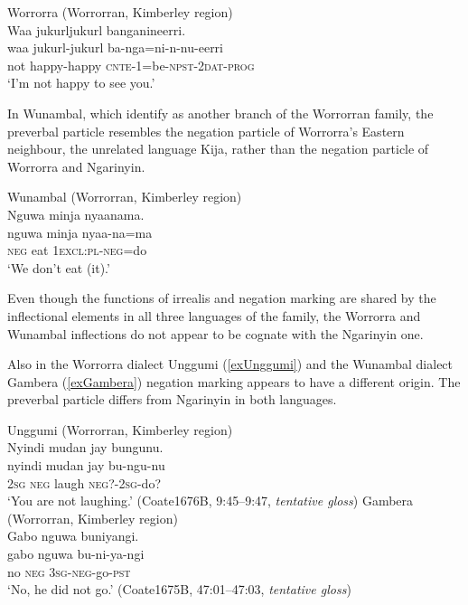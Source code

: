 \documentclass[output=paper,colorlinks,citecolor=brown]{langscibook}
\begin{document}
\begin{exe}
\ex \label{exWorrorra} {Worrorra} (Worrorran, Kimberley region)\\
    \glll Waa jukurljukurl banganineerri.\\
    waa jukurl-jukurl ba-nga=ni-n-nu-eerri\\
    not happy-happy \textsc{cnte}-1=be-\textsc{npst}-\textsc{2dat}-\textsc{prog}\\
    \trans `I'm not happy to see you.' \citep[195]{Clendon2014}
\end{exe}

In Wunambal, which \citet{McGregorRumsey2009} identify as another branch of the Worrorran family, the preverbal particle resembles the negation particle of Worrorra's Eastern neighbour, the unrelated language Kija, rather than the negation particle of Worrorra and Ngarinyin.

\begin{exe}
\ex \label{exWunambal} {Wunambal} (Worrorran, Kimberley region) \\
    \glll Nguwa minja nyaanama.\\
    nguwa minja nyaa-na=ma\\
    \textsc{neg} eat 1\textsc{excl:pl}-\textsc{neg}=do\\
    \trans `We don't eat (it).' \citep[184, cf. Kija (Jarrakan) \textit{nguwan} NEG]{Carr2000}
\end{exe}

Even though the functions of irrealis and negation marking are shared by the inflectional elements in all three languages of the family, the Worrorra and Wunambal inflections do not appear to be cognate with the Ngarinyin one.

Also in the Worrorra dialect Unggumi (\ref{exUnggumi}) and the Wunambal dialect Gambera (\ref{exGambera}) negation marking appears to have a different origin. The preverbal particle differs from Ngarinyin in both languages.

\begin{exe}
\ex \label{exUnggumi} {Unggumi} (Worrorran, Kimberley region) \\
    \glll Nyindi mudan jay bungunu.\\
    nyindi mudan jay bu-ngu-nu\\
    2\textsc{sg} \textsc{neg} laugh \textsc{neg}?-2\textsc{sg}-do?\\
    \trans `You are not laughing.' (Coate1676B, 9:45--9:47, \textit{tentative gloss})
\ex \label{exGambera} {Gambera} (Worrorran, Kimberley region) \\
    \glll Gabo nguwa buniyangi.\\
    gabo nguwa bu-ni-ya-ngi\\
    no \textsc{neg} 3\textsc{sg}-\textsc{neg}-go-\textsc{pst}\\
    \trans `No, he did not go.' (Coate1675B, 47:01--47:03, \textit{tentative gloss})
\end{exe}
\end{document}
